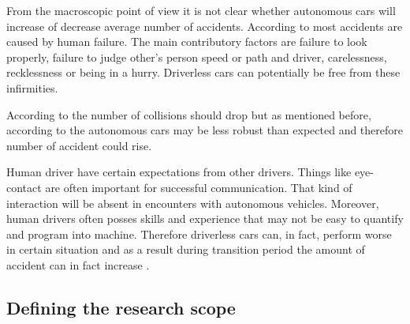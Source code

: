 \documentclass[11pt,english]{article}
\begin{document}
\par
From the macroscopic point of view it is not clear whether autonomous cars will increase of decrease average number of accidents. According to \citet{excel} most accidents are caused by human failure. The main contributory factors are failure to look properly, failure to judge other's person speed or path and driver, carelessness, recklessness or being in a hurry. Driverless cars can potentially be free from these infirmities.
\par
According to \citet{pathwaytodriverless} the number of collisions should drop but as mentioned before, according to \citet{sivak2015road} the autonomous cars may be less robust than expected and therefore number of accident could rise. 


\par
Human driver have certain expectations from other drivers. Things like eye-contact are often important for successful communication. That kind of interaction will be absent in encounters with autonomous vehicles. Moreover, human drivers often posses skills and experience that may not be easy to quantify and program into machine. Therefore driverless cars can, in fact, perform worse in certain situation and as a result during transition period the amount of accident can in fact increase \citep{sivak2015road}.





















\subsection{Defining the research scope}
\end{document}
